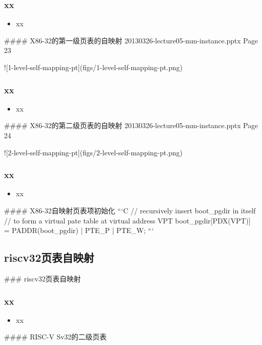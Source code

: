 \begin{frame}
    \frametitle{xx}
    \begin{itemize}
        \item xx
    \end{itemize}
\end{frame}
#### X86-32的第一级页表的自映射
20130326-lecture05-mm-instance.pptx
Page 23

![1-level-self-mapping-pt](figs/1-level-self-mapping-pt.png)

\begin{frame}
    \frametitle{xx}
    \begin{itemize}
        \item xx
    \end{itemize}
\end{frame}
#### X86-32的第二级页表的自映射
20130326-lecture05-mm-instance.pptx
Page 24

![2-level-self-mapping-pt](figs/2-level-self-mapping-pt.png)

\begin{frame}
    \frametitle{xx}
    \begin{itemize}
        \item xx
    \end{itemize}
\end{frame}
#### X86-32自映射页表项初始化
```C
// recursively insert boot_pgdir in itself
// to form a virtual pate table at virtual address VPT
boot_pgdir[PDX(VPT)] = PADDR(boot_pgdir) | PTE_P | PTE_W;
```
\subsection{riscv32页表自映射} %
### riscv32页表自映射

\begin{frame}
    \frametitle{xx}
    \begin{itemize}
        \item xx
    \end{itemize}
\end{frame}
#### RISC-V Sv32的二级页表

